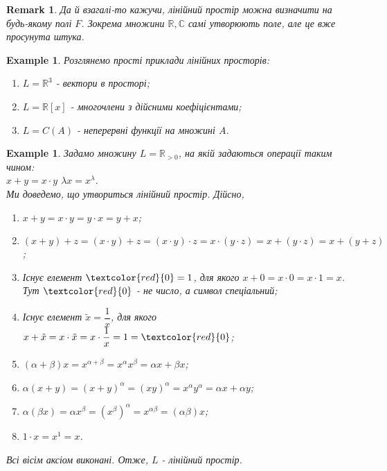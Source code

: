 \documentclass[a4paper, 10pt]{article}
\theoremstyle{theoremdd}
\newtheorem{example}[theorem]{Example}
\newtheorem{remark}[theorem]{Remark}
\begin{document}
	\begin{remark}
	Да й взагалі-то кажучи, лінійний простір можна визначити на будь-якому полі $F$. Зокрема множини $\mathbb{R}, \mathbb{C}$ самі утворюють поле, але це вже просунута штука.
	\end{remark}
	
	\begin{example}
	Розглянемо прості приклади лінійних просторів:
	\begin{enumerate}[nosep, wide=0pt, label={\arabic*)}]
	\item $L = \mathbb{R}^3$ - вектори в просторі;
	\item $L = \mathbb{R}[x]$ - многочлени з дійсними коефіцієнтами;
	\item $L = C(A)$ - неперервні функції на множині $A$.
	\end{enumerate}
	\end{example}
	
	\begin{example}
	Задамо множину $L = \mathbb{R}_{> 0}$, на якій задаються операції таким чином:\\
	$x + y = x \cdot y$ \quad $\lambda x = x^\lambda$.\\
	Ми доведемо, що утвориться лінійний простір. Дійсно,
	\begin{enumerate}[nosep, wide=0pt, label={\arabic*)}]
	\item $x+y = x \cdot y = y \cdot x = y + x$;
	\item $(x+y) + z = (x \cdot y) + z = (x \cdot y) \cdot z = x \cdot (y \cdot z) = x + (y \cdot z) = x + (y + z)$;
	\item Існує елемент $\textcolor{red}{0} = 1$, для якого $x + 0 = x \cdot 0 = x \cdot 1 = x$. Тут $\textcolor{red}{0}$ - не число, а символ спеціальний;
	\item Існує елемент $\tilde{x} = \dfrac{1}{x}$, для якого $x + \tilde{x} = x \cdot \tilde{x} = x \cdot \dfrac{1}{x} = 1 = \textcolor{red}{0}$;
	\item $(\alpha + \beta)x = x^{\alpha + \beta} = x^{\alpha} x^{\beta} = \alpha x + \beta x$;
	\item $\alpha (x+y) = (x+y)^\alpha = (xy)^{\alpha} = x^{\alpha} y^{\alpha} = \alpha x + \alpha y$;
	\item $\alpha (\beta x) = \alpha x^\beta = (x^\beta)^\alpha = x^{\alpha \beta} = (\alpha \beta) x$;
	\item $1 \cdot x = x^1 = x$.
	\end{enumerate}
	Всі вісім аксіом виконані. Отже, $L$ - лінійний простір.
	\end{example}
	
\end{document}
